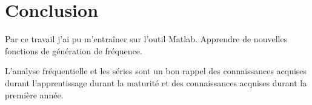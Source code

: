 \section{Conclusion}
Par ce travail j'ai pu m'entraîner sur l'outil Matlab. Apprendre de nouvelles fonctions de génération de fréquence. 

L'analyse fréquentielle et les séries sont un bon rappel des connaissances acquises durant l'apprentissage durant la maturité et des connaissances acquises durant la première année.





